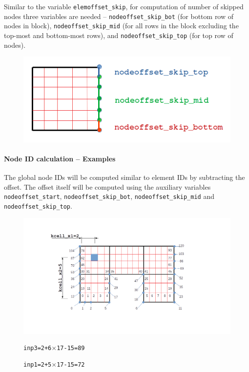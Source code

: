 \documentclass[a4paper,12pt]{article}
\begin{document}
Similar to the variable \texttt{elemoffset\_skip}, for computation of number of skipped nodes three variables are needed -- \texttt{nodeoffset\_skip\_bot} (for bottom row of nodes in block), \texttt{nodeoffset\_skip\_mid} (for all rows in the block excluding the top-most and bottom-most rows), and \texttt{nodeoffset\_skip\_top} (for top row of nodes).
\begin{figure}[H]
	\centering
	\includegraphics[scale=0.6]{figures/NodeOffset-new.png}	
\end{figure}

\paragraph{Node ID calculation -- Examples} The global node IDs will be computed similar to element IDs by subtracting the offset. The offset itself will be computed using the auxiliary variables \texttt{nodeoffset\_start}, \texttt{nodeoffset\_skip\_bot}, \texttt{nodeoffset\_skip\_mid} and \texttt{nodeoffset\_skip\_top}.

\begin{figure}[H]
	\centering
	\includegraphics[trim=140 120 200 75,clip,scale=0.4]{figures/InactiveMeshNodeIDCalc-Eg1.png}	
	\caption{\texttt{inp1=2+5$\times$17-15=72}}{\texttt{inp3=2+6$\times$17-15=89}}
\end{figure}
\end{document}
